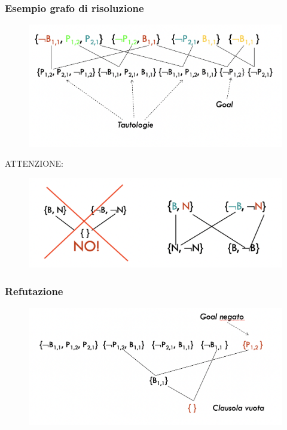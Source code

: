 \documentclass{article}
\begin{document}
\subsubsection{Esempio grafo di risoluzione}
\begin{figure}[H]
\centering
\includegraphics[scale=0.5]{Images/esgraforisoluzione.png}
\end{figure}
ATTENZIONE:
\begin{figure}[H]
\centering
\includegraphics[scale=0.5]{Images/danger.png}
\end{figure}
\subsubsection{Refutazione}
\begin{figure}[H]
\centering
\includegraphics[scale=0.5]{Images/refutazione.png}
\end{figure}
\end{document}
